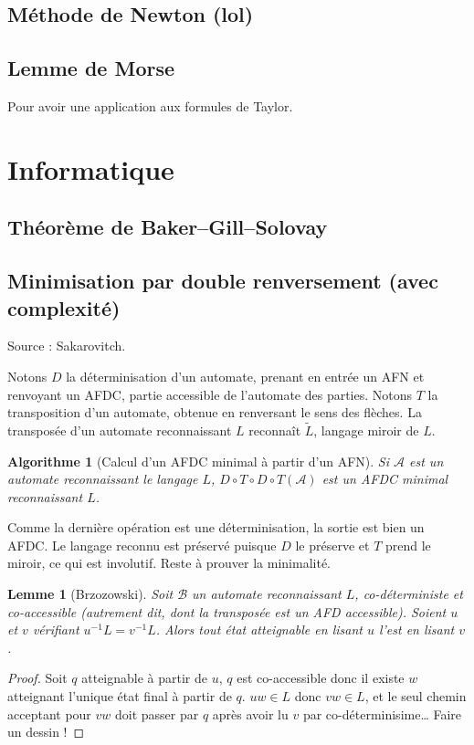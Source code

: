 \documentclass[a4paper, 11pt]{article}
\newtheorem*{algo}{Algorithme}
\newtheorem*{lemma}{Lemme}
\begin{document}
\subsection{Méthode de Newton (lol)}

\subsection{Lemme de Morse}

Pour avoir une application aux formules de Taylor.

\section{Informatique}

\subsection{Théorème de Baker--Gill--Solovay}



\subsection{Minimisation par double renversement (avec complexité)}

Source : Sakarovitch.

Notons $D$ la déterminisation d'un automate, prenant en entrée un AFN et
renvoyant un AFDC, partie accessible de l'automate des parties. Notons $T$ la
transposition d'un automate, obtenue en renversant le sens des flèches. La
transposée d'un automate reconnaissant $L$ reconnaît $\tilde{L}$, langage miroir
de $L$.

\begin{algo}[Calcul d'un AFDC minimal à partir d'un AFN]
  Si $\mathcal{A}$ est un automate reconnaissant le langage $L$, $D \circ T
  \circ D \circ T(\mathcal{A})$ est un AFDC minimal reconnaissant $L$.
\end{algo}

Comme la dernière opération est une déterminisation, la sortie est bien un AFDC.
Le langage reconnu est préservé puisque $D$ le préserve et $T$ prend le miroir,
ce qui est involutif. Reste à prouver la minimalité.

\begin{lemma}[Brzozowski]
  Soit $\mathcal{B}$ un automate reconnaissant $L$, \emph{co-déterministe} et
  \emph{co-accessible} (autrement dit, dont la transposée est un AFD
  accessible). Soient $u$ et $v$ vérifiant $u^{-1}L = v^{-1}L$. Alors tout état
  atteignable en lisant $u$ l'est en lisant $v$.
\end{lemma}
\begin{proof}
  Soit $q$ atteignable à partir de $u$, $q$ est co-accessible donc il existe $w$
  atteignant l'unique état final à partir de $q$. $uw \in L$ donc $vw \in L$, et
  le seul chemin acceptant pour $vw$ doit passer par $q$ après avoir lu $v$ par
  co-déterminisime… Faire un dessin !
\end{proof}
\end{document}
